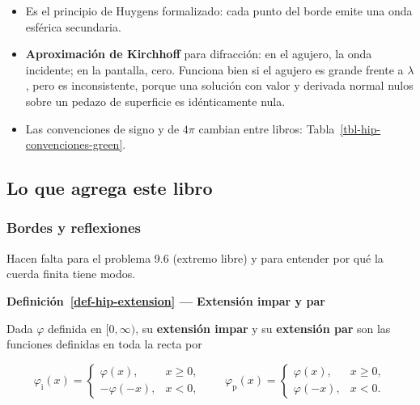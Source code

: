 \documentclass[
  spanish,
  a4paper,
]{scrbook}
\providecommand{\tightlist}{%
  \setlength{\itemsep}{0pt}\setlength{\parskip}{0pt}}
\theoremstyle{definition}
\theoremstyle{plain}
\theoremstyle{definition}
\theoremstyle{plain}
\theoremstyle{definition}
\theoremstyle{remark}
\begin{document}
\begin{itemize}
\tightlist
\item
  Es el principio de Huygens formalizado: cada punto del borde emite una
  onda esférica secundaria.
\item
  \textbf{Aproximación de Kirchhoff} para difracción: en el agujero, la
  onda incidente; en la pantalla, cero. Funciona bien si el agujero es
  grande frente a \(\lambda\), pero es inconsistente, porque una
  solución con valor y derivada normal nulos sobre un pedazo de
  superficie es idénticamente nula.
\item
  Las convenciones de signo y de \(4\pi\) cambian entre libros:
  Tabla~\ref{tbl-hip-convenciones-green}.
\end{itemize}

\subsection{Lo que agrega este libro}\label{sec-hip-resumen-10}

\subsubsection{Bordes y reflexiones}\label{bordes-y-reflexiones}

Hacen falta para el problema 9.6 (extremo libre) y para entender por qué
la cuerda finita tiene modos.

\begin{tcolorbox}[enhanced jigsaw, arc=.35mm, bottomrule=.15mm, breakable, colback=white, colframe=quarto-callout-note-color-frame, left=2mm, leftrule=.75mm, opacityback=0, rightrule=.15mm, toprule=.15mm]
\begin{minipage}[t]{5.5mm}
\textcolor{quarto-callout-note-color}{\faInfo}
\end{minipage}%
\begin{minipage}[t]{\textwidth - 5.5mm}

\vspace{-3mm}\textbf{Definición~\ref{def-hip-extension} --- Extensión impar y par}\vspace{3mm}

Dada \(\varphi\) definida en \([0,\infty)\), su \textbf{extensión impar}
y su \textbf{extensión par} son las funciones definidas en toda la recta
por

\[
\varphi_{\text{i}}(x) = \begin{cases}\varphi(x), & x\ge0,\\ -\varphi(-x), & x<0,\end{cases}
\qquad
\varphi_{\text{p}}(x) = \begin{cases}\varphi(x), & x\ge0,\\ \varphi(-x), & x<0.\end{cases}
\]

\end{minipage}%
\end{tcolorbox}
\end{document}
